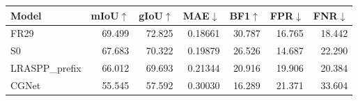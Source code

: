 \par\medskip\noindent\begin{minipage}{\linewidth}
\centering\small\setlength{\tabcolsep}{3pt}
\label{tab:gegd}
\begin{tabular}{lrrrrrr}
\toprule
Model & mIoU$\uparrow$ & gIoU$\uparrow$ & MAE$\downarrow$ & BF1$\uparrow$ & FPR$\downarrow$ & FNR$\downarrow$\\\midrule

FR29 & 69.499 & 72.825 & 0.18661 & 30.787 & 16.765 & 18.442\\
S0 & 67.683 & 70.322 & 0.19879 & 26.526 & 14.687 & 22.290\\
LRASPP\_prefix & 66.012 & 69.693 & 0.21344 & 20.916 & 19.906 & 20.384\\
CGNet & 55.545 & 57.592 & 0.30030 & 16.289 & 21.371 & 33.604\\
\bottomrule
\end{tabular}
\end{minipage}\par\medskip
